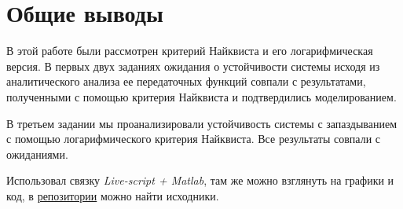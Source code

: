 \chapter{Общие выводы}
\label{ch:chap6}

В этой работе были рассмотрен критерий Найквиста и его логарифмическая версия. В первых двух заданиях ожидания о устойчивости системы исходя из
аналитического анализа ее передаточных функций совпали с результатами, полученными с помощью критерия Найквиста и подтвердились моделированием. 

В третьем задании мы проанализировали устойчивость системы с запаздыванием с помощью логарифмического
критерия Найквиста. Все результаты совпали с ожиданиями.

Использовал связку \textit{Live-script + Matlab}, там же можно взглянуть на графики и код, в \href{https://github.com/GreedlyCore/control_theory_course}{репозитории} можно найти исходники. 
\endinput